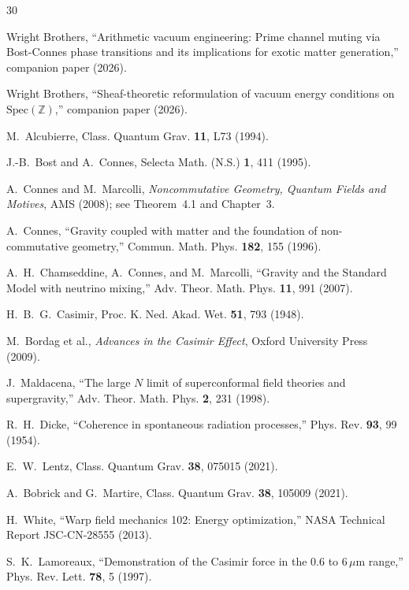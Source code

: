 \documentclass[aps,prd,twocolumn,superscriptaddress,nofootinbib]{revtex4-2}
\newcommand{\Spec}{\mathrm{Spec}}
\begin{document}
\begin{thebibliography}{30}

Wright Brothers,
``Arithmetic vacuum engineering: Prime channel muting via
Bost-Connes phase transitions and its implications for
exotic matter generation,''
companion paper (2026).

Wright Brothers,
``Sheaf-theoretic reformulation of vacuum energy conditions
on $\Spec(\mathbb{Z})$,''
companion paper (2026).

M.~Alcubierre,
Class. Quantum Grav. \textbf{11}, L73 (1994).

J.-B.~Bost and A.~Connes,
Selecta Math. (N.S.) \textbf{1}, 411 (1995).

A.~Connes and M.~Marcolli,
\emph{Noncommutative Geometry, Quantum Fields and Motives},
AMS (2008); see Theorem~4.1 and Chapter~3.

A.~Connes,
``Gravity coupled with matter and the foundation of
non-commutative geometry,''
Commun. Math. Phys. \textbf{182}, 155 (1996).

A.~H.~Chamseddine, A.~Connes, and M.~Marcolli,
``Gravity and the Standard Model with neutrino mixing,''
Adv. Theor. Math. Phys. \textbf{11}, 991 (2007).

H.~B.~G.~Casimir,
Proc. K. Ned. Akad. Wet. \textbf{51}, 793 (1948).

M.~Bordag et al.,
\emph{Advances in the Casimir Effect},
Oxford University Press (2009).

J.~Maldacena,
``The large $N$ limit of superconformal field theories
and supergravity,''
Adv. Theor. Math. Phys. \textbf{2}, 231 (1998).

R.~H.~Dicke,
``Coherence in spontaneous radiation processes,''
Phys. Rev. \textbf{93}, 99 (1954).

E.~W.~Lentz,
Class. Quantum Grav. \textbf{38}, 075015 (2021).

A.~Bobrick and G.~Martire,
Class. Quantum Grav. \textbf{38}, 105009 (2021).

H.~White,
``Warp field mechanics 102: Energy optimization,''
NASA Technical Report JSC-CN-28555 (2013).

S.~K.~Lamoreaux,
``Demonstration of the Casimir force in the 0.6 to $6\,\mu$m range,''
Phys. Rev. Lett. \textbf{78}, 5 (1997).

\end{thebibliography}
\end{document}
